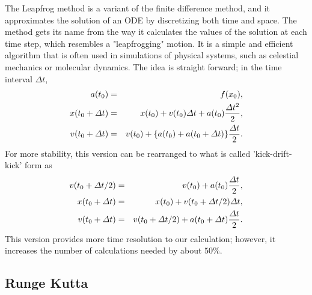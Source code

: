 \documentclass[a4paper,oneside,12pt]{report}
\numberwithin{equation}{chapter}
\begin{document}
The Leapfrog method is a variant of the finite difference method, and it approximates the solution of an ODE by discretizing both time and space. The method gets its name from the way it calculates the values of the solution at each time step, which resembles a "leapfrogging" motion. 
It is a simple and efficient algorithm that is often used in simulations of physical systems, such as celestial mechanics or molecular dynamics.
The idea is straight forward; in the time interval $\Delta t$, 
\vspace{-10pt}\begin{eqnarray}
    a(t_0) &=& f(x_0)   , \\
    x(t_0 + \Delta t) &=& x(t_0) + v(t_0)\Delta t + a(t_0)\frac{\Delta t^2}{2}   ,\label{eq:leapfrog_sync_x}\\
    v(t_0 + \Delta t) &=& v(t_0) + \{ a(t_0) + a(t_0 + \Delta t)\}\frac{\Delta t}{2} . \label{eq:leapfrog_sync_v}
\vspace{-10pt}\end{eqnarray}
For more stability, this version can be rearranged to what is called 'kick-drift-kick' form as
\vspace{-10pt}\begin{eqnarray} \label{eq:leapfrog}
    v(t_0 + \Delta t/2) &=& v(t_0) +  a(t_0)\frac{\Delta t}{2}   ,  \\
    x(t_0 + \Delta t) &=& x(t_0) + v(t_0 + \Delta t/2)\Delta t   , \\
    v(t_0 + \Delta t) &=& v(t_0 + \Delta t/2) + a(t_0 + \Delta t)\frac{\Delta t}{2} . 
\vspace{-10pt}\end{eqnarray}
This version provides more time resolution to our calculation; however, it increases the number of calculations needed by about $50\%$.

\subsection{Runge Kutta} \label{sec:rungekutta}
\end{document}
